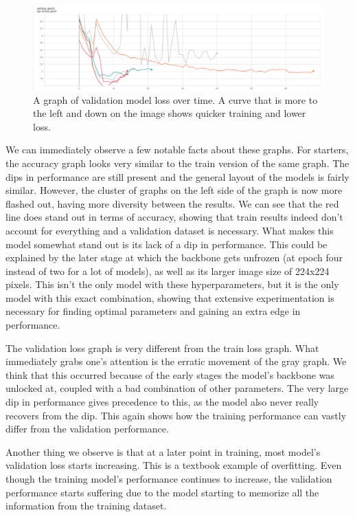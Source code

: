\documentclass[]{article}
\begin{document}
\begin{figure}
\centering
\includegraphics[width=1\textwidth,height=\textheight]{./tex2pdf.-3ffa51a14b505aec/3f53e535e759e2c4f42e296f842f33808219bebd.png}
\caption{A graph of validation model loss over time. A curve that is
more to the left and down on the image shows quicker training and lower
loss.}
\end{figure}

We can immediately observe a few notable facts about these graphs. For
starters, the accuracy graph looks very similar to the train version of
the same graph. The dips in performance are still present and the
general layout of the models is fairly similar. However, the cluster of
graphs on the left side of the graph is now more flashed out, having
more diversity between the results. We can see that the red line does
stand out in terms of accuracy, showing that train results indeed don't
account for everything and a validation dataset is necessary. What makes
this model somewhat stand out is its lack of a dip in performance. This
could be explained by the later stage at which the backbone gets
unfrozen (at epoch four instead of two for a lot of models), as well as
its larger image size of 224x224 pixels. This isn't the only model with
these hyperparameters, but it is the only model with this exact
combination, showing that extensive experimentation is necessary for
finding optimal parameters and gaining an extra edge in performance.

The validation loss graph is very different from the train loss graph.
What immediately grabs one's attention is the erratic movement of the
gray graph. We think that this occurred because of the early stages the
model's backbone was unlocked at, coupled with a bad combination of
other parameters. The very large dip in performance gives precedence to
this, as the model also never really recovers from the dip. This again
shows how the training performance can vastly differ from the validation
performance.

Another thing we observe is that at a later point in training, most
model's validation loss starts increasing. This is a textbook example of
overfitting. Even though the training model's performance continues to
increase, the validation performance starts suffering due to the model
starting to memorize all the information from the training dataset.
\end{document}
